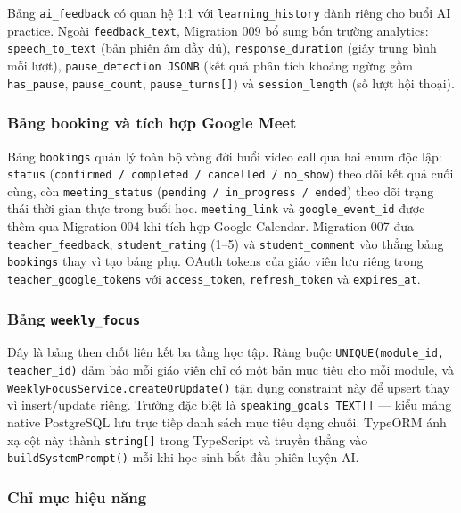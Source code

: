Bảng \texttt{ai\_feedback} có quan hệ 1:1 với \texttt{learning\_history} dành riêng cho buổi AI practice. Ngoài \texttt{feedback\_text}, Migration 009 bổ sung bốn trường analytics: \texttt{speech\_to\_text} (bản phiên âm đầy đủ), \texttt{response\_duration} (giây trung bình mỗi lượt), \texttt{pause\_detection JSONB} (kết quả phân tích khoảng ngừng gồm \texttt{has\_pause}, \texttt{pause\_count}, \texttt{pause\_turns[]}) và \texttt{session\_length} (số lượt hội thoại).

\subsubsection{Bảng booking và tích hợp Google Meet}

Bảng \texttt{bookings} quản lý toàn bộ vòng đời buổi video call qua hai enum độc lập: \texttt{status} (\texttt{confirmed / completed / cancelled / no\_show}) theo dõi kết quả cuối cùng, còn \texttt{meeting\_status} (\texttt{pending / in\_progress / ended}) theo dõi trạng thái thời gian thực trong buổi học. \texttt{meeting\_link} và \texttt{google\_event\_id} được thêm qua Migration 004 khi tích hợp Google Calendar. Migration 007 đưa \texttt{teacher\_feedback}, \texttt{student\_rating} (1--5) và \texttt{student\_comment} vào thẳng bảng \texttt{bookings} thay vì tạo bảng phụ. OAuth tokens của giáo viên lưu riêng trong \texttt{teacher\_google\_tokens} với \texttt{access\_token}, \texttt{refresh\_token} và \texttt{expires\_at}.

\subsubsection{Bảng \texttt{weekly\_focus}}

Đây là bảng then chốt liên kết ba tầng học tập. Ràng buộc \texttt{UNIQUE(module\_id, teacher\_id)} đảm bảo mỗi giáo viên chỉ có một bản mục tiêu cho mỗi module, và \texttt{WeeklyFocusService.createOrUpdate()} tận dụng constraint này để upsert thay vì insert/update riêng. Trường đặc biệt là \texttt{speaking\_goals TEXT[]} — kiểu mảng native PostgreSQL lưu trực tiếp danh sách mục tiêu dạng chuỗi. TypeORM ánh xạ cột này thành \texttt{string[]} trong TypeScript và truyền thẳng vào \texttt{buildSystemPrompt()} mỗi khi học sinh bắt đầu phiên luyện AI.

\subsubsection{Chỉ mục hiệu năng}

